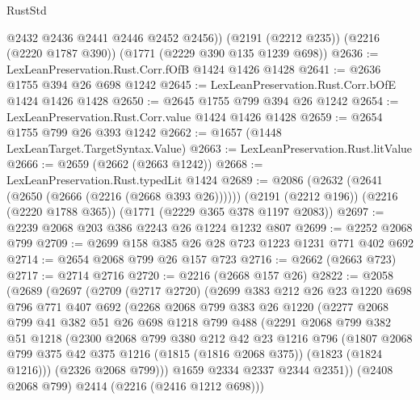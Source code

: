 \begin{lexlean}{RustStd}
\begin{coremodule}
        @2432
        @2436
        @2441
        @2446
        @2452
        @2456))
    (@2191 (@2212 @235))
    (@2216 (@2220 @1787 @390))
    (@1771 (@2229 @390 @135 @1239 @698))
@2636 := LexLeanPreservation.Rust.Corr.fOfB @1424 @1426 @1428
@2641 := @2636 @1755 @394 @26 @698 @1242
@2645 := LexLeanPreservation.Rust.Corr.bOfE @1424 @1426 @1428
@2650 := @2645 @1755 @799 @394 @26 @1242
@2654 := LexLeanPreservation.Rust.Corr.value @1424 @1426 @1428
@2659 := @2654 @1755 @799 @26 @393 @1242
@2662 := @1657 (@1448 LexLeanTarget.TargetSyntax.Value)
@2663 := LexLeanPreservation.Rust.litValue
@2666 := @2659 (@2662 (@2663 @1242))
@2668 := LexLeanPreservation.Rust.typedLit @1424
@2689 := @2086
    (@2632 (@2641 (@2650 (@2666 (@2216 (@2668 @393 @26))))))
    (@2191 (@2212 @196))
    (@2216 (@2220 @1788 @365))
    (@1771 (@2229 @365 @378 @1197 @2083))
@2697 := @2239 @2068 @203 @386 @2243 @26 @1224 @1232 @807
@2699 := @2252 @2068 @799
@2709 := @2699 @158 @385 @26 @28 @723 @1223 @1231 @771 @402 @692
@2714 := @2654 @2068 @799 @26 @157 @723
@2716 := @2662 (@2663 @723)
@2717 := @2714 @2716
@2720 := @2216 (@2668 @157 @26)
@2822 := @2058
    (@2689
      (@2697
        (@2709
          (@2717 @2720)
          (@2699
            @383
            @212
            @26
            @23
            @1220
            @698
            @796
            @771
            @407
            @692
            (@2268
              @2068
              @799
              @383
              @26
              @1220
              (@2277
                @2068
                @799
                @41
                @382
                @51
                @26
                @698
                @1218
                @799
                @488
                (@2291
                  @2068
                  @799
                  @382
                  @51
                  @1218
                  (@2300
                    @2068
                    @799
                    @380
                    @212
                    @42
                    @23
                    @1216
                    @796
                    (@1807
                      @2068
                      @799
                      @375
                      @42
                      @375
                      @1216
                      (@1815 (@1816 @2068 @375))
                      (@1823 (@1824 @1216)))
                    (@2326 @2068 @799)))
                @1659
                @2334
                @2337
                @2344
                @2351))
            (@2408 @2068 @799)
            @2414
            (@2216 (@2416 @1212 @698)))

\end{coremodule}
\end{lexlean}
